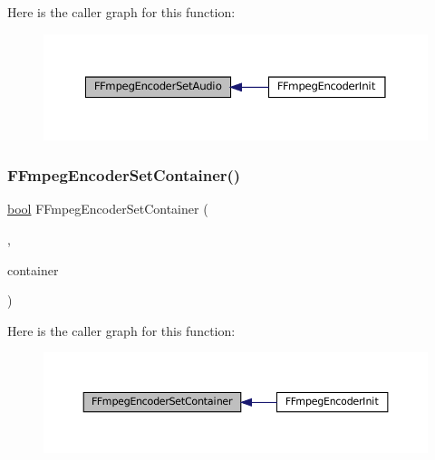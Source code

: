 Here is the caller graph for this function\+:
\nopagebreak
\begin{figure}[H]
\begin{center}
\leavevmode
\includegraphics[width=350pt]{ffmpeg-encoder_8h_ae3fa582320c53317a31597aba10d7356_icgraph}
\end{center}
\end{figure}
\mbox{\label{ffmpeg-encoder_8h_a5543df3e61f1004fe0a5ebb9fcd27a42}} 
\subsubsection{\texorpdfstring{F\+Fmpeg\+Encoder\+Set\+Container()}{FFmpegEncoderSetContainer()}}
{\footnotesize\ttfamily \mbox{\hyperlink{libretro_8h_a4a26dcae73fb7e1528214a068aca317e}{bool}} F\+Fmpeg\+Encoder\+Set\+Container (\begin{DoxyParamCaption}\item[{struct \mbox{\hyperlink{ffmpeg-encoder_8h_struct_f_fmpeg_encoder}{F\+Fmpeg\+Encoder}} $\ast$}]{,  }\item[{const char $\ast$}]{container }\end{DoxyParamCaption})}

Here is the caller graph for this function\+:
\nopagebreak
\begin{figure}[H]
\begin{center}
\leavevmode
\includegraphics[width=350pt]{ffmpeg-encoder_8h_a5543df3e61f1004fe0a5ebb9fcd27a42_icgraph}
\end{center}
\end{figure}
\mbox{\label{ffmpeg-encoder_8h_acca84883ea3484ebd2b83a8378bc722b}} 
